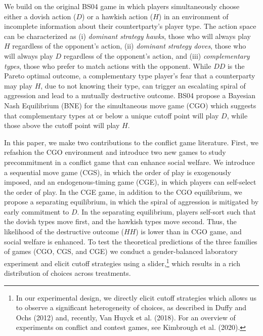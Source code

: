 \documentclass[12pt, letterpaper]{article}
\theoremstyle{plain}
\begin{document}
We build on the original BS04 game in which players simultaneously choose either a dovish action ($D$) or a hawkish action ($H$) in an environment of incomplete information about their countertparty's player type. The action space can be characterized as (i) \textit{dominant strategy hawks}, those who will always play $H$ regardless of the opponent's action, (ii) \textit{dominant strategy doves}, those who will always play $D$ regardless of the opponent's action, and (iii) \textit{complementary types}, those who prefer to match actions with the opponent. While $DD$ is the Pareto optimal outcome, a complementary type player's fear that a counterparty may play $H$, due to not knowing their type, can trigger an escalating spiral of aggression and lead to a mutually destructive outcome. BS04 propose a Bayesian Nash Equilibrium (BNE) for the simultaneous move game (CGO) which suggests that complementary types at or below a unique cutoff point will play $D$, while those above the cutoff point will play $H$.

In this paper, we make two contributions to the conflict game literature. First, we refashion the CGO environment and introduce two new games to study precommitment in a conflict game that can enhance social welfare. We introduce a sequential move game (CGS), in which the order of play is exogenously imposed, and an endogenous-timing game (CGE), in which players can self-select the order of play. In the CGE game, in addition to the CGO equilibrium, we propose a separating equilibrium, in which the spiral of aggression is mitigated by early commitment to $D$. In the separating equilibrium, players self-sort such that the dovish types move first, and the hawkish types move second. Thus, the likelihood of the destructive outcome ($HH$) is lower than in CGO game, and social welfare is enhanced. To test the theoretical predictions of the three families of games (CGO, CGS, and CGE) we conduct a gender-balanced laboratory experiment and elicit cutoff strategies using a slider,\footnote{In our experimental design, we directly elicit cutoff strategies which allows us to observe a significant heterogeneity of choices, as described in Duffy and Ochs (2012) and, recently, Van Huyck et al. (2018).  For an overview of experiments on conflict and contest games, see Kimbrough et al. (2020). } which results in a rich distribution of choices across treatments. 
\end{document}

